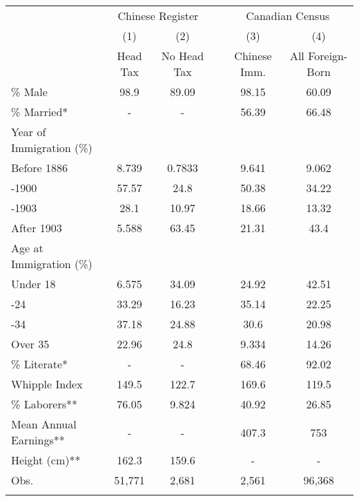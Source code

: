 \begin{tabular}{lccccc}
\hhline{======}
& \multicolumn{2}{c}{Chinese Register} & & \multicolumn{2}{c}{Canadian Census} \\ 
\hhline{~--~--}
& (1) & (2) & & (3) & (4)\\ 
& Head Tax & No Head Tax & & Chinese Imm. & All Foreign-Born \\ 
 \hhline{------}
\% Male &  98.9&89.09&&98.15&60.09 \\ 
\% Married* & -&-&&56.39&66.48 \\ 
Year of Immigration (\%)&&&&&\\
\;\; Before 1886 & 8.739&0.7833&&9.641&9.062 \\ 
\;\; 1886-1900 & 57.57& 24.8&&50.38&34.22 \\ 
\;\; 1901-1903 &  28.1&10.97&&18.66&13.32 \\ 
\;\;After 1903 & 5.588&63.45&&21.31& 43.4 \\ 
Age at Immigration (\%)&&&&&\\
\;\; Under 18 & 6.575&34.09&&24.92&42.51 \\ 
\;\; 18-24 & 33.29&16.23&&35.14&22.25 \\ 
\;\; 25-34 & 37.18&24.88&& 30.6&20.98 \\ 
\;\; Over 35 & 22.96& 24.8&&9.334&14.26 \\ 
\% Literate* & -&-&&68.46&92.02 \\ 
Whipple Index & 149.5&122.7&&169.6&119.5 \\ 
\% Laborers** & 76.05&9.824&&40.92&26.85 \\ 
Mean Annual Earnings** & -&-&&407.3&  753 \\ 
Height (cm)** & 162.3&159.6&&-&- \\ 
Obs.
&
51,771&2,681&&2,561&96,368
\\ 
\hhline{======}
\end{tabular}

